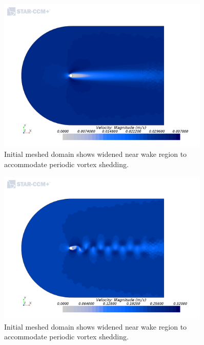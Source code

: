 \documentclass[10pt,english]{article}
\begin{document}
 \begin{figure}[h]
\centering
\includegraphics[trim={0.0cm 0cm 0.0cm 0cm},clip,width=0.9\textwidth]{cylinder_2_016_ScalarScene1_re20.png}
\vspace{-5pt}
\caption{Initial meshed domain shows widened near wake region to accommodate periodic vortex shedding. }
\label{f:cylinder_2_016_ScalarScene1_re20}
\end{figure}

 \begin{figure}[h]
\centering
\includegraphics[trim={0.0cm 0cm 0.0cm 0cm},clip,width=0.9\textwidth]{cylinder_2_016_ScalarScene1.png}
\vspace{-5pt}
\caption{Initial meshed domain shows widened near wake region to accommodate periodic vortex shedding. }
\label{f:cylinder_2_016_ScalarScene1}
\end{figure}
\end{document}
